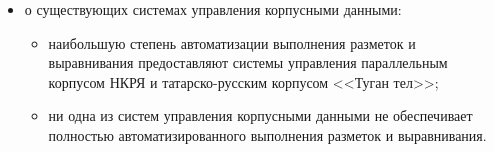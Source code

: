 \begin{itemize}
\begin{itemize}
		\item большинство рассмотренных методов построения деревьев зависимостей имеют линейную вычислительную сложность;
		\item большинству рассмотренных методов построения синтаксической разметки требуются морфологические характеристики словоформ;
		\item фундаментальным ограничением большинства рассмотренных методов является требование проективности языка;
		\item большинство рассмотренных методов могут быть применены к различным языкам;
	\end{itemize}
	\item о существующих системах управления корпусными данными:
	\begin{itemize}
		\item наибольшую степень автоматизации выполнения разметок и выравнивания предоставляют системы управления параллельным корпусом НКРЯ и татарско-русским корпусом <<Туган тел>>;
		\item ни одна из систем управления корпусными данными не обеспечивает полностью автоматизированного выполнения разметок и выравнивания.
	\end{itemize}
\end{itemize}
